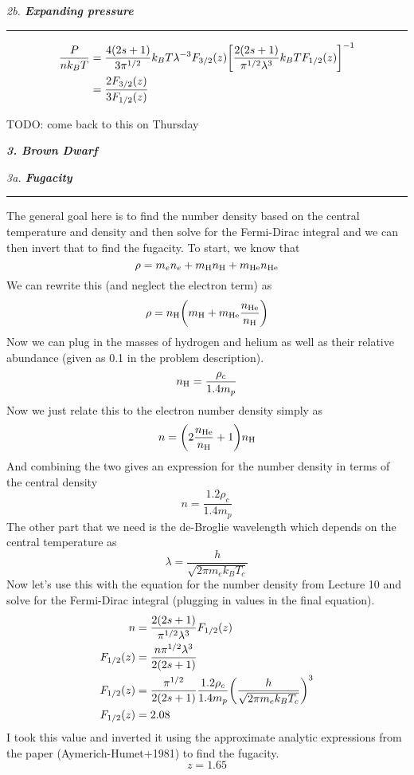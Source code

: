 \documentclass[12pt, letterpaper, twoside]{article}
\newcommand{\question}[1]{{\noindent \it #1}}
\newcommand{\answer}[1]{
    \par\noindent\rule{\textwidth}{0.4pt}#1\vspace{0.5cm}
}
\newcommand{\todo}[1]{{\color{red}\begin{center}TODO: #1\end{center}}}
\begin{document}
\question{2b. \textbf{Expanding pressure}}
\answer{
    \begin{align}
        \frac{P}{n k_B T} &= \frac{4(2s + 1)}{3 \pi^{1/2}} k_B T \lambda^{-3} F_{3/2}(z) \qty[\frac{2(2s + 1)}{\pi^{1/2} \lambda^3} k_B T F_{1/2}(z)]^{-1} \\
                          &= \frac{2 F_{3/2}(z)}{3 F_{1/2}(z)}
    \end{align}
    \todo{come back to this on Thursday}
}

\question{\textbf{3. Brown Dwarf}}

\question{3a. \textbf{Fugacity}}
\answer{
    The general goal here is to find the number density based on the central temperature and density and then solve for the Fermi-Dirac integral and we can then invert that to find the fugacity. To start, we know that
    \begin{equation}
        \rho = m_e n_e + m_{\rm H} n_{\rm H} + m_{\rm He} n_{\rm He}
    \end{equation}
    We can rewrite this (and neglect the electron term) as
    \begin{equation}
        \rho = n_{\rm H} \qty(m_{\rm H} + m_{\rm He} \frac{n_{\rm He}}{n_{\rm H}})
    \end{equation}
    Now we can plug in the masses of hydrogen and helium as well as their relative abundance (given as 0.1 in the problem description).
    \begin{equation}
        n_{\rm H} = \frac{\rho_c}{1.4 m_p}
    \end{equation}
    Now we just relate this to the electron number density simply as
    \begin{equation}
        n = \qty(2 \frac{n_{\rm He}}{n_{\rm H}} + 1) n_{\rm H}
    \end{equation}
    And combining the two gives an expression for the number density in terms of the central density
    \begin{equation}
        n = \frac{1.2 \rho_c}{1.4 m_p}
    \end{equation}
    The other part that we need is the de-Broglie wavelength which depends on the central temperature as
    \begin{equation}
        \lambda = \frac{h}{\sqrt{2 \pi m_e k_B T_c}}
    \end{equation}
    Now let's use this with the equation for the number density from Lecture 10 and solve for the Fermi-Dirac integral (plugging in values in the final equation).
    \begin{align}
        n &= \frac{2(2s + 1)}{\pi^{1/2} \lambda^3} F_{1/2}(z) \\
        F_{1/2}(z) &= \frac{n \pi^{1/2} \lambda^3}{2(2s + 1)} \\
        F_{1/2}(z) &= \frac{\pi^{1/2}}{2(2s + 1)} \frac{1.2 \rho_c}{1.4 m_p} \qty(\frac{h}{\sqrt{2 \pi m_e k_B T_c}})^3 \\
        F_{1/2}(z) &= 2.08
    \end{align}
    I took this value and inverted it using the approximate analytic expressions from the paper (Aymerich-Humet+1981) to find the fugacity.
    \begin{equation}
        \boxed{ z = 1.65 }
    \end{equation}
}
\end{document}
